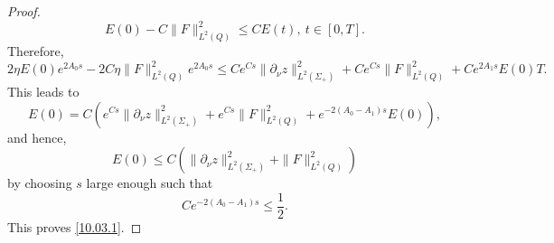 \documentclass[11pt]{article}
\numberwithin{equation}{section}
\def\pt{\partial}
\def\pt{\partial}
\def\f{\frac}
\begin{document}
\begin{proof}
			\begin{equation*}
				E(0)-C\|F\|_{L^2(Q)}^2\leq CE(t), \ t\in [0,T].
			\end{equation*}
			Therefore,
			\begin{equation*}
				2\eta E(0)e^{2A_0s}-2C\eta \|F\|_{L^2(Q)}^2e^{2A_0s}\leq Ce^{Cs}\|\pt_\nu z\|_{L^2(\Sigma_+)}^2+Ce^{Cs}\|F\|_{L^2(Q)}^2+Ce^{2A_1s}E(0)T.
			\end{equation*}
			This leads to
			\begin{equation*}
				E(0)=C\left(e^{Cs}\|\pt_\nu z\|_{L^2(\Sigma_+)}^2+e^{Cs}\|F\|_{L^2(Q)}^2+e^{-2(A_0-A_1)s}E(0)\right),
			\end{equation*}
			and hence,
			\begin{equation*}
				E(0)\leq C\left(\|\pt_\nu z\|_{L^2(\Sigma_+)}^2+\|F\|_{L^2(Q)}^2\right)
			\end{equation*}
			by choosing $s$ large enough  such that
			\begin{equation*}
				Ce^{-2(A_0-A_1)s}\leq \f{1}{2}.
			\end{equation*}
			This proves \eqref{10.03.1}.
		\end{proof}
		
\end{document}
